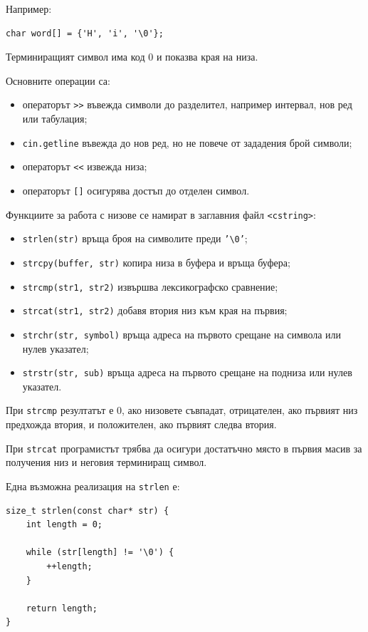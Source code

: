 Например:

\begin{verbatim}
char word[] = {'H', 'i', '\0'};
\end{verbatim}

Терминиращият символ има код $0$ и показва края на низа.

Основните операции са:

\begin{itemize}
\item операторът \texttt{>>} въвежда символи до разделител, например интервал, нов ред или табулация;
\item \texttt{cin.getline} въвежда до нов ред, но не повече от зададения брой символи;
\item операторът \texttt{<<} извежда низа;
\item операторът \texttt{[]} осигурява достъп до отделен символ.
\end{itemize}

Функциите за работа с низове се намират в заглавния файл \texttt{<cstring>}:

\begin{itemize}
\item \texttt{strlen(str)} връща броя на символите преди \texttt{'\textbackslash 0'};
\item \texttt{strcpy(buffer, str)} копира низа в буфера и връща буфера;
\item \texttt{strcmp(str1, str2)} извършва лексикографско сравнение;
\item \texttt{strcat(str1, str2)} добавя втория низ към края на първия;
\item \texttt{strchr(str, symbol)} връща адреса на първото срещане на символа или нулев указател;
\item \texttt{strstr(str, sub)} връща адреса на първото срещане на подниза или нулев указател.
\end{itemize}

При \texttt{strcmp} резултатът е $0$, ако низовете съвпадат, отрицателен, ако първият низ предхожда втория, и положителен, ако първият следва втория.

При \texttt{strcat} програмистът трябва да осигури достатъчно място в първия масив за получения низ и неговия терминиращ символ.

Една възможна реализация на \texttt{strlen} е:

\begin{verbatim}
size_t strlen(const char* str) {
    int length = 0;

    while (str[length] != '\0') {
        ++length;
    }

    return length;
}
\end{verbatim}

